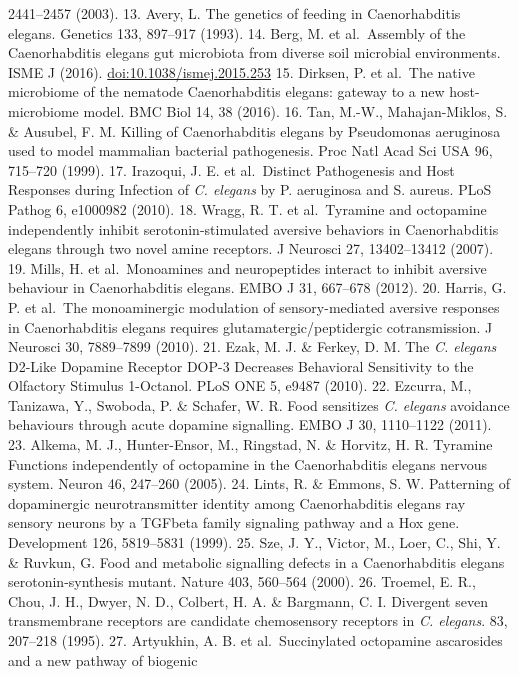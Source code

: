 \documentclass[]{article}
\begin{document}
2441--2457 (2003). 13. Avery, L. The genetics of feeding in
Caenorhabditis elegans. Genetics 133, 897--917 (1993). 14. Berg, M. et
al.~Assembly of the Caenorhabditis elegans gut microbiota from diverse
soil microbial environments. ISME J (2016).
\url{doi:10.1038/ismej.2015.253} 15. Dirksen, P. et al.~The native
microbiome of the nematode Caenorhabditis elegans: gateway to a new
host-microbiome model. BMC Biol 14, 38 (2016). 16. Tan, M.-W.,
Mahajan-Miklos, S. \& Ausubel, F. M. Killing of Caenorhabditis elegans
by Pseudomonas aeruginosa used to model mammalian bacterial
pathogenesis. Proc Natl Acad Sci USA 96, 715--720 (1999). 17. Irazoqui,
J. E. et al.~Distinct Pathogenesis and Host Responses during Infection
of \textit{C. elegans} by P. aeruginosa and S. aureus. PLoS Pathog 6,
e1000982 (2010). 18. Wragg, R. T. et al.~Tyramine and octopamine
independently inhibit serotonin-stimulated aversive behaviors in
Caenorhabditis elegans through two novel amine receptors. J Neurosci 27,
13402--13412 (2007). 19. Mills, H. et al.~Monoamines and neuropeptides
interact to inhibit aversive behaviour in Caenorhabditis elegans. EMBO J
31, 667--678 (2012). 20. Harris, G. P. et al.~The monoaminergic
modulation of sensory-mediated aversive responses in Caenorhabditis
elegans requires glutamatergic/peptidergic cotransmission. J Neurosci
30, 7889--7899 (2010). 21. Ezak, M. J. \& Ferkey, D. M. The
\textit{C. elegans} D2-Like Dopamine Receptor DOP-3 Decreases Behavioral
Sensitivity to the Olfactory Stimulus 1-Octanol. PLoS ONE 5, e9487
(2010). 22. Ezcurra, M., Tanizawa, Y., Swoboda, P. \& Schafer, W. R.
Food sensitizes \textit{C. elegans} avoidance behaviours through acute
dopamine signalling. EMBO J 30, 1110--1122 (2011). 23. Alkema, M. J.,
Hunter-Ensor, M., Ringstad, N. \& Horvitz, H. R. Tyramine Functions
independently of octopamine in the Caenorhabditis elegans nervous
system. Neuron 46, 247--260 (2005). 24. Lints, R. \& Emmons, S. W.
Patterning of dopaminergic neurotransmitter identity among
Caenorhabditis elegans ray sensory neurons by a TGFbeta family signaling
pathway and a Hox gene. Development 126, 5819--5831 (1999). 25. Sze, J.
Y., Victor, M., Loer, C., Shi, Y. \& Ruvkun, G. Food and metabolic
signalling defects in a Caenorhabditis elegans serotonin-synthesis
mutant. Nature 403, 560--564 (2000). 26. Troemel, E. R., Chou, J. H.,
Dwyer, N. D., Colbert, H. A. \& Bargmann, C. I. Divergent seven
transmembrane receptors are candidate chemosensory receptors in
\textit{C. elegans}. 83, 207--218 (1995). 27. Artyukhin, A. B. et
al.~Succinylated octopamine ascarosides and a new pathway of biogenic
\end{document}
